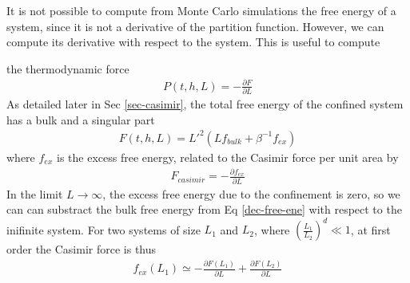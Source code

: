 It is not possible to compute from Monte Carlo simulations the free energy of a system, since it is not a derivative of the partition function. However, we can compute its derivative with respect to the system. This is useful to compute {\color{red}the thermodynamic force
\begin{align}
P(t,h,L) = - \frac{\partial F}{\partial L}
\label{casmir-mc}
\end{align}
As detailed later in Sec \ref{sec-casimir}, the total free energy of the confined system has a bulk and a singular part
\begin{align}
    F(t,h,L) = L'^2 \left( L f_{bulk} + \beta^{-1} f_{ex} \right)
    \label{dec-free-ene}
\end{align}
where $f_{ex}$ is the excess free energy, related to the Casimir force per unit area by
\begin{align}
    F_{casimir} = - \frac{\partial  f_{ex}}{\partial L}
\end{align}
In the limit $L\to \infty$, the excess free energy due to the confinement is zero, so we can can substract the bulk free energy from Eq \eqref{dec-free-ene} with respect to the inifinite system. For two systems of size $L_1$  and $L_2$, where $ \left( \frac{L_1}{L_2} \right)^d \ll 1$, at first order the Casimir force is thus
\begin{align}
    f_{ex}(L_1) \simeq - \frac{\partial F(L_1)}{\partial L} + \frac{\partial F(L_2)}{\partial L}
    \label{cas-diff}
\end{align}

}

